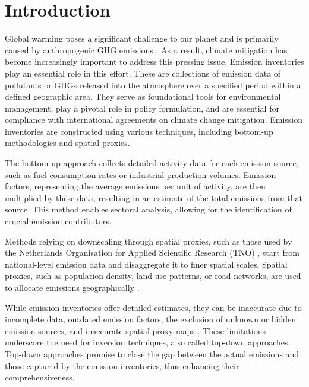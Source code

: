 
\chapter{Introduction}\label{chapter:introduction}

Global warming poses a significant challenge to our planet and is primarily caused by anthropogenic \gls{GHG} emissions \parencite{IPCC_AR6}.
As a result, climate mitigation has become increasingly important to address this pressing issue.
Emission inventories play an essential role in this effort.
These are collections of emission data of pollutants or \gls{GHG}s released into the atmosphere over a specified period within a defined geographic area.
They serve as foundational tools for environmental management, play a pivotal role in policy formulation, and are essential for compliance with international agreements on climate change mitigation.
Emission inventories are constructed using various techniques, including bottom-up methodologies and spatial proxies.

The bottom-up approach collects detailed activity data for each emission source, such as fuel consumption rates or industrial production volumes.
Emission factors, representing the average emissions per unit of activity, are then multiplied by these data, resulting in an estimate of the total emissions from that source.
This method enables sectoral analysis, allowing for the identification of crucial emission contributors.

Methods relying on downscaling through spatial proxies, such as those used by the Netherlands Organisation for Applied Scientific Research (TNO) \parencite{TNO_HighRes15, TNO_HighRes18}, start from national-level emission data and disaggregate it to finer spatial scales.
Spatial proxies, such as population density, land use patterns, or road networks, are used to allocate emissions geographically \parencite{SpatialProxies}.

While emission inventories offer detailed estimates, they can be inaccurate due to incomplete data, outdated emission factors, the exclusion of unknown or hidden emission sources, and inaccurate spatial proxy maps \parencite{InventoryUncertainties}.
These limitations underscore the need for inversion techniques, also called top-down approaches.
Top-down approaches promise to close the gap between the actual emissions and those captured by the emission inventories, thus enhancing their comprehensiveness.

